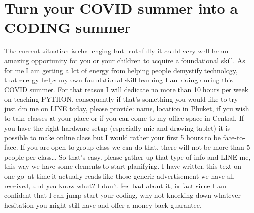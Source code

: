 \documentclass[11pt]{article}
\begin{document}
\section{Turn your COVID summer into a CODING summer}
\label{sec:orgbe13258}
The current situation is challenging but truthfully it could very well be an amazing opportunity for you or your children to acquire a foundational skill. As for me I am getting a lot of energy from helping people demystify technology, that energy helps my own foundational skill learning I am doing during this COVID summer. For that reason I will dedicate no more than 10 hours per week on teaching PYTHON, consequently if that’s something you would like to try just dm me on LINE today, please provide:
name, location in Phuket, if you wish to take classes at your place or if  you can come to my office-space in Central. If you have the right hardware setup (especially mic and drawing tablet) it is possible to make online class but I would rather your first 5 hours to be face-to-face. If you are open to group class we can do that, there will not be more than 5 people per class\ldots{} So  that’s easy, please gather up that type of info and LINE me, this way we have some elements to start planifying.
I have written this text on one go, at time it actually reads like those generic advertisement we have all received, and you know what? I don’t feel bad about it, in fact since I am confident that I can jump-start your coding, why not knocking-down whatever hesitation you might still have and offer a money-back guarantee.
\end{document}
